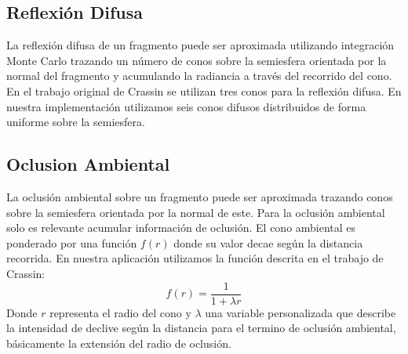 \subsection{Reflexión Difusa}
La reflexión difusa de un fragmento puede ser aproximada utilizando integración Monte Carlo trazando un número de conos sobre la semiesfera orientada por la normal del fragmento y acumulando la radiancia a través del recorrido del cono. En el trabajo original de Crassin se utilizan tres conos para la reflexión difusa. En nuestra implementación utilizamos seis conos difusos distribuidos de forma uniforme sobre la semiesfera.
\subsection{Oclusion Ambiental}
\label{sub:occl_ambt_prop}
La oclusión ambiental sobre un fragmento puede ser aproximada trazando conos sobre la semiesfera orientada por la normal de este. Para la oclusión ambiental solo es relevante acumular información de oclusión. El cono ambiental es ponderado por una función $f(r)$ donde su valor decae según la distancia recorrida. En nuestra aplicación utilizamos la función descrita en el trabajo de Crassin:
\begin{equation}
	f(r) = \frac{1}{1+\lambda r}
\end{equation}
Donde $r$ representa el radio del cono y $\lambda$ una variable personalizada que describe la intensidad de declive según la distancia para el termino de oclusión ambiental, básicamente la extensión del radio de oclusión.
